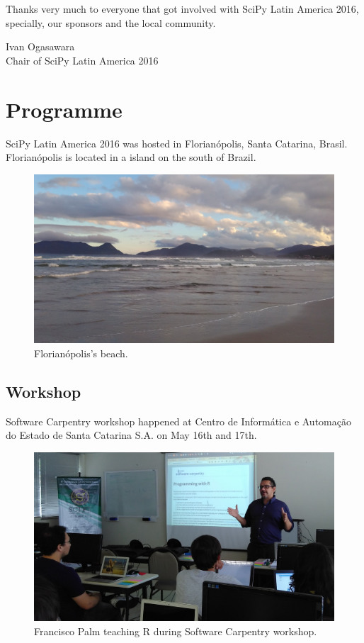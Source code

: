 \documentclass[12pt]{article}
\begin{document}
Thanks very much to everyone that got involved with SciPy Latin America 2016,
specially, our sponsors and the local community.

\indent Ivan Ogasawara \\
\indent Chair of SciPy Latin America 2016


\clearpage
\newpage

\section*{Programme}

SciPy Latin America 2016 was hosted in Florianópolis, Santa Catarina, Brasil.
Florianópolis is located in a island on the south of Brazil.

\begin{figure}[!htb]
\center
\includegraphics[height=.3\textheight]{venue-beach.jpg}
\caption{Florianópolis's beach.}
\end{figure}

\subsection*{Workshop}

Software Carpentry workshop happened at
Centro de Informática e Automação
do Estado de Santa Catarina S.A. on May 16th and 17th.

\begin{figure}[!htb]
\center
\includegraphics[height=.3\textheight]{swc-francisco.jpg}
\caption{Francisco Palm teaching R during Software Carpentry workshop.}
\end{figure}
\end{document}
